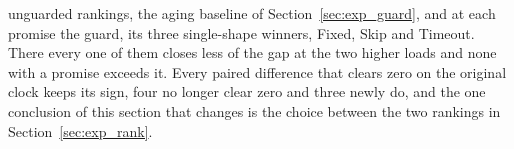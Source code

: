 unguarded rankings, the aging baseline of Section~\ref{sec:exp_guard}, and at each promise
the guard, its three
single-shape winners, Fixed, Skip and Timeout. There every one of them closes less of the
gap at the two higher loads and none with a promise exceeds it. Every paired difference that
clears zero on the original clock keeps its sign, four no longer clear zero and three newly
do, and the one conclusion of this section that changes is the choice between the two
rankings in Section~\ref{sec:exp_rank}.

